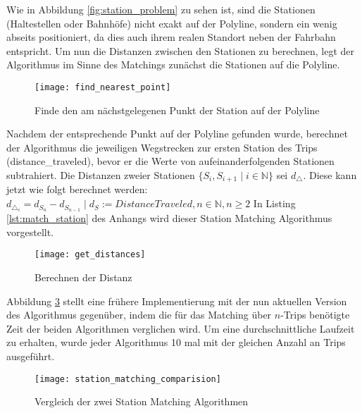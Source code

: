     Wie in Abbildung \ref{fig:station_problem} zu sehen ist, sind die Stationen (Haltestellen oder Bahnhöfe) nicht exakt auf der Polyline, sondern ein wenig abseits positioniert, da dies auch ihrem realen Standort neben der Fahrbahn entspricht. Um nun die Distanzen zwischen den Stationen zu berechnen, legt der Algorithmus im Sinne des Matchings zunächst die Stationen auf die Polyline.  

    \begin{figure}[htbp]
      \begin{center}
        \texttt{[image: find\_nearest\_point]}
        \caption{Finde den am nächstgelegenen Punkt der Station auf der Polyline}
        \label{fig:find_nearest_point}
      \end{center}
    \end{figure}

    Nachdem der entsprechende Punkt auf der Polyline gefunden wurde, berechnet der Algorithmus die jeweiligen Wegstrecken zur ersten Station des Trips (distance\_traveled), bevor er die Werte von aufeinanderfolgenden Stationen subtrahiert.  Die Distanzen zweier Stationen $\{S_i,S_{i+1} \;|\; i \in \mathbb{N} \}$ sei $d_\triangle$. Diese kann jetzt wie folgt berechnet werden: $d_{\triangle_i} = d_{S_n} - d_{S_{n-1}}\;|\; d_S := DistanceTraveled, n \in \mathbb{N}, n \ge 2$ 
    In Listing \ref{lst:match_station} des Anhangs wird dieser Station Matching Algorithmus vorgestellt.

    \begin{figure}[htbp]
      \begin{center}
        \texttt{[image: get\_distances]}
        \caption{Berechnen der Distanz}
        \label{fig:get_distances}
      \end{center}
    \end{figure}
    
    Abbildung \ref{fig:station_matching_comparision} stellt eine frühere Implementierung mit der nun aktuellen Version des Algorithmus gegenüber, indem die für das Matching über $n$-Trips benötigte Zeit der beiden Algorithmen verglichen wird. Um eine durchschnittliche Laufzeit zu erhalten, wurde jeder Algorithmus 10 mal mit der gleichen Anzahl an Trips ausgeführt.

    \begin{figure}[htbp]
      \begin{center}
        \texttt{[image: station\_matching\_comparision]}
        \caption{Vergleich der zwei Station Matching Algorithmen}
        \label{fig:station_matching_comparision}
      \end{center}
    \end{figure}

